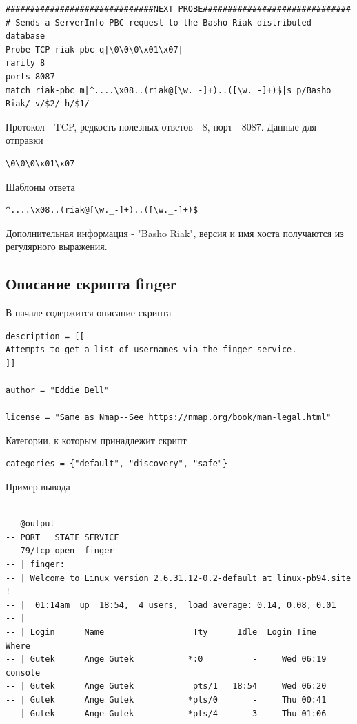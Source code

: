 \documentclass[10pt,a4paper]{report}
\begin{document}
\begin{verbatim}
##############################NEXT PROBE##############################
# Sends a ServerInfo PBC request to the Basho Riak distributed database
Probe TCP riak-pbc q|\0\0\0\x01\x07|
rarity 8
ports 8087
match riak-pbc m|^....\x08..(riak@[\w._-]+)..([\w._-]+)$|s p/Basho Riak/ v/$2/ h/$1/
\end{verbatim}

Протокол - TCP, редкость полезных ответов - 8, порт - 8087.
Данные для отправки \begin{verbatim}\0\0\0\x01\x07\end{verbatim}
Шаблоны ответа 
\begin{verbatim}
^....\x08..(riak@[\w._-]+)..([\w._-]+)$
\end{verbatim}
Дополнительная информация - "Basho Riak", версия и имя хоста получаются из регулярного выражения.

\subsection{Описание скрипта finger}
\label{finger_script}

В начале содержится описание скрипта

\begin{verbatim}
description = [[
Attempts to get a list of usernames via the finger service.
]]

author = "Eddie Bell"

license = "Same as Nmap--See https://nmap.org/book/man-legal.html"
\end{verbatim}

Категории, к которым принадлежит скрипт

\begin{verbatim}
categories = {"default", "discovery", "safe"}
\end{verbatim}

Пример вывода

\begin{verbatim}
---
-- @output
-- PORT   STATE SERVICE
-- 79/tcp open  finger
-- | finger:
-- | Welcome to Linux version 2.6.31.12-0.2-default at linux-pb94.site !
-- |  01:14am  up  18:54,  4 users,  load average: 0.14, 0.08, 0.01
-- |
-- | Login      Name                  Tty      Idle  Login Time   Where
-- | Gutek      Ange Gutek           *:0          -     Wed 06:19 console
-- | Gutek      Ange Gutek            pts/1   18:54     Wed 06:20
-- | Gutek      Ange Gutek           *pts/0       -     Thu 00:41
-- |_Gutek      Ange Gutek           *pts/4       3     Thu 01:06
\end{verbatim}
\end{document}
